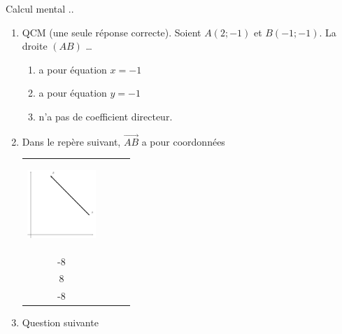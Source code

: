 \documentclass{beamer}
\newcommand{\vect}[1]{\overrightarrow{#1}}    %
\begin{document}
\begin{frame}{Calcul mental ..}
    \begin{enumerate}
        \item
            QCM (une seule réponse correcte). Soient \( A(2;-1)\) et \( B(-1;-1)\). La droite \( (AB)\) \ldots
            \begin{enumerate}
                \item
                    a pour équation \( x=-1\)
                \item
                    a pour équation \( y=-1\)
                \item
                    n'a pas de coefficient directeur.
            \end{enumerate}

        \item

                Dans le repère suivant, \( \vect{ AB }\) a pour coordonnées 
            \begin{tabular}[]{cccc}

                \begin{minipage}{0.3\textwidth}
                    

                \begin{center}
\includegraphics[width=2.6cm]{Picture_FIGLabelFigUZlaYZPICTUZlaYZ-for_eps.png}
                \end{center}
                \end{minipage}
                
   &\( \begin{pmatrix}
       -3 \\ 
       -8 
   \end{pmatrix}\)&\( \begin{pmatrix}
       -3 \\ 
       8 
   \end{pmatrix}\)&\( \begin{pmatrix}
       3 \\ 
       -8 
   \end{pmatrix}\)\\
            \end{tabular}
            
            
        \item
            Question suivante

    \end{enumerate}
\end{frame}
\end{document}
